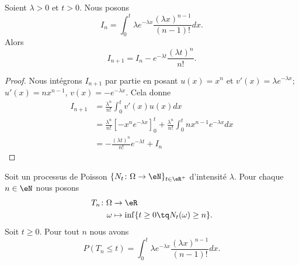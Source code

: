 \begin{lemma}     \label{LEMooJHMTooQWvOaI}
    Soient \( \lambda>0\) et \( t>0\). Nous posons
    \begin{equation}
        I_n=\int_0^t\lambda e^{-\lambda x}\frac{ (\lambda x)^{n-1} }{ (n-1)! }dx.
    \end{equation}
    Alors
    \begin{equation}
        I_{n+1}=I_n- e^{-\lambda t}\frac{ (\lambda t)^n }{ n! }.
    \end{equation}
\end{lemma}

\begin{proof}
    Nous intégrons \( I_{n+1}\) par partie en posant \( u(x)=x^n\) et \( v'(x)=\lambda e^{-\lambda x}\); \( u'(x)=nx^{n-1}\), \( v(x)=- e^{-\lambda x}\). Cela donne
    \begin{subequations}
        \begin{align}
            I_{n+1}&=\frac{ \lambda^n }{ n! }\int_0^tv'(x)u(x)dx\\
        &=\frac{ \lambda^n }{ n! }\left[ -x^n e^{-\lambda x} \right]_0^t+\frac{ \lambda^n }{ n! }\int_0^tnx^{n-1} e^{-\lambda x}dx\\
        &=-\frac{ (\lambda t)^n }{ n! } e^{-\lambda t}+I_n
        \end{align}
    \end{subequations}
\end{proof}

\begin{lemma}
    Soit un processus de Poisson \(  \{ N_t\colon \Omega\to \eN \}_{t\in \eR^+}  \) d'intensité \( \lambda\). Pour chaque \( n\in \eN\) nous posons
    \begin{equation}
        \begin{aligned}
            T_n\colon \Omega&\to \eR \\
            \omega&\mapsto \inf\{ t\geq 0\tq N_t(\omega)\geq n \}. 
        \end{aligned}
    \end{equation}
    Soit \( t\geq 0\). Pour tout \( n\) nous avons
    \begin{equation}    \label{EQooRHQLooVxFfjV}
        P(T_n\leq t)=\int_0^t\lambda  e^{-\lambda x}\frac{ (\lambda x)^{n-1} }{ (n-1)! }dx.
    \end{equation}
\end{lemma}

